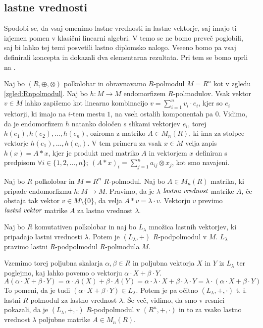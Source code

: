 \documentclass[mat1]{fmfdelo}
\newcommand{\pojem}[1]{\ensuremath{\emph{#1}}}
\newcommand{\map}[3]{\ensuremath{{#1}:{#2}\rightarrow{#3}}}
\begin{document}
\subsection{lastne vrednosti}
Spodobi se, da vsaj omenimo lastne vrednosti in lastne vektorje, saj imajo ti izjemen pomen v klasični linearni algebri. V temo se ne bomo preveč poglobili, saj bi lahko tej temi posvetili lastno diplomsko nalogo. Vseeno bomo pa vsaj definirali koncepta in dokazali dva elementarna rezultata. Pri tem se bomo uprli na \cite{bib:Gondran}.

Naj bo $(R, \oplus, \otimes)$ polkolobar in obravnavamo $R$-polmodul $M = R^n$ kot v zgledu \ref{zgled:Rnpolmodul}. Naj bo $\map{h}{M}{M}$ endomorfizem $R$-polmodulov. Vsak vektor $v\in M$ lahko zapišemo kot linearno kombinacijo $v = \sum_{i = 1}^{n}v_i\cdot e_i$, kjer so $e_i$ vektorji, ki imajo na $i$-tem mestu $1$, na vseh ostalih komponentah pa $0$. Vidimo, da je endomorfizem $h$ natanko določen s slikami vektorjev $e_i$, torej $h(e_1), h(e_2), \ldots, h(e_n)$, oziroma z matriko $A\in M_n(R)$, ki ima za stolpce vektorje $h(e_1), \ldots, h(e_n)$. V tem primeru za vsak $x\in M$ velja zapis $h(x) = A*x$, kjer je produkt med matriko $A$ in vektorjem $x$ definiran s predpisom $\forall i\in \{1, 2, \ldots, n\};~(A*x)_i = \sum_{j = 1}^{n} a_{ij}\otimes x_j$, kot smo navajeni.

\begin{definicija}
	Naj bo $R$ polkolobar in $M = R^n$ $R$-polmodul. Naj bo $A\in M_n(R)$ matrika, ki pripade endomorfizmu $\map{h}{M}{M}$. Pravimo, da je $\lambda$ \pojem{lastna vrednost} matrike $A$, če obstaja tak vektor $v\in M\setminus\{0\}$, da velja $A * v = \lambda \cdot v$. Vektorju $v$ previmo \pojem{lastni vektor} matrike $A$ za lastno vrednost $\lambda$.
\end{definicija}


\begin{trditev}
Naj bo $R$ komutativen polkolobar in naj bo $L_\lambda$ množica lastnih vektorjev, ki pripadajo lastni vrednosti $\lambda$. Potem je $(L_\lambda, +)$ $R$-podpolmodul v $M$. $L_\lambda$ pravimo lastni $R$-podpolmodul $R$-polmodula $M$.
\end{trditev}

\begin{dokaz}
Vzemimo torej poljubna skalarja $\alpha, \beta\in R$ in poljubna vektorja $X$ in $Y$ iz $L_\lambda$ ter poglejmo, kaj lahko povemo o vektorju $\alpha\cdot X + \beta\cdot Y$. $$A(\alpha\cdot X + \beta\cdot Y) = \alpha\cdot A(X) + \beta\cdot A(Y) = \alpha\cdot\lambda\cdot X + \beta\cdot\lambda\cdot Y = \lambda\cdot (\alpha\cdot X + \beta\cdot Y)$$ To pomeni, da je tudi $(\alpha\cdot X + \beta\cdot Y)\in L_\lambda$. Potem je pa očitno $(L_\lambda, +, \cdot)$ t. i. lastni $R$-polmodul za lastno vrednost $\lambda$. Še več, vidimo, da smo v resnici pokazali, da je $(L_\lambda, +, \cdot)$ $R$-podpolmodul v $(R^n, +, \cdot)$ in to za vsako lastno vrednost $\lambda$ poljubne matrike $A\in M_n(R)$.
\end{dokaz}
\end{document}
